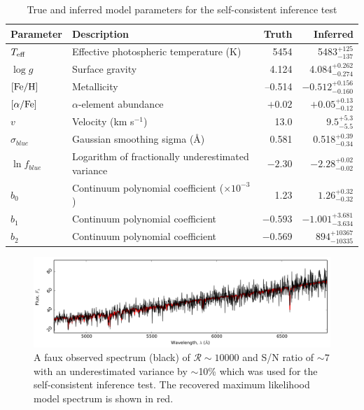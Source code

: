 \documentclass[iop]{emulateapj}
\begin{document}
\begin{table}
\center
\caption{True and inferred model parameters for the self-consistent inference test}
\label{tab:inference-test}
\begin{tabular}{llrr}
\hline
\hline
Parameter & Description & Truth & Inferred \\
\hline
$T_{\rm eff}$ & Effective photospheric temperature (K) & 5454 & 5483$_{-137}^{+125}$ \\
$\log{}g$ & Surface gravity & 4.124 & 4.084$_{-0.274}^{+0.262}$ \\
${\rm [Fe/H]}$  & Metallicity & --0.514 & $-0.512_{-0.160}^{+0.156}$ \\
$[\alpha/{\rm Fe}]$ & $\alpha$-element abundance & $+0.02$ & $+0.05_{-0.12}^{+0.13}$ \\
$v$     & Velocity (km s$^{-1}$) & 13.0 & $9.5_{-5.5}^{+5.3}$ \\
$\sigma_{blue}$ & Gaussian smoothing sigma (\AA{}) & 0.581 & 0.518$_{-0.34}^{+0.39}$ \\
$\ln{f_{blue}}$ & Logarithm of fractionally underestimated variance & $-2.30$ & $-2.28_{-0.02}^{+0.02}$ \\
$b_{0}$ & Continuum polynomial coefficient ($\times10^{-3}$) & 1.23 & $1.26_{-0.32}^{+0.32}$ \\
$b_{1}$ & Continuum polynomial coefficient & $-0.593$ & $-1.001_{-3.634}^{+3.681}$ \\
$b_{2}$ & Continuum polynomial coefficient & $-0.569$ & $894_{-10335}^{+10367}$ \\
\hline
\end{tabular}
\end{table}

\begin{figure}
\label{fig:spectrum-inference}
\includegraphics[width=\textwidth]{figures/spectrum.pdf}
\caption{A faux observed spectrum (black) of $\mathcal{R} \sim 10000$ and S/N 
ratio of $\sim7$ with an underestimated variance by $\sim$10\% which was used for 
the self-consistent inference test. The recovered maximum likelihood model spectrum 
is shown in red. }
\end{figure}
\end{document}
